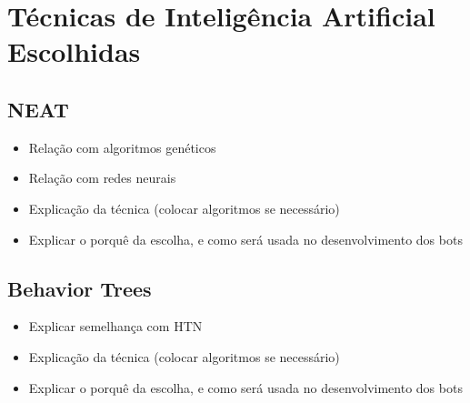 \chapter{\label{chap:ai-techniques}Técnicas de Inteligência Artificial
Escolhidas}

\section{NEAT}

\begin{itemize}
    \item
        Relação com algoritmos genéticos
    \item
        Relação com redes neurais
    \item
        Explicação da técnica (colocar algoritmos se necessário)
    \item
        Explicar o porquê da escolha, e como será usada no
        desenvolvimento dos bots
\end{itemize}

\section{Behavior Trees}

\begin{itemize}
    \item
        Explicar semelhança com HTN
    \item
        Explicação da técnica (colocar algoritmos se necessário)
    \item
        Explicar o porquê da escolha, e como será usada no
        desenvolvimento dos bots
\end{itemize}
